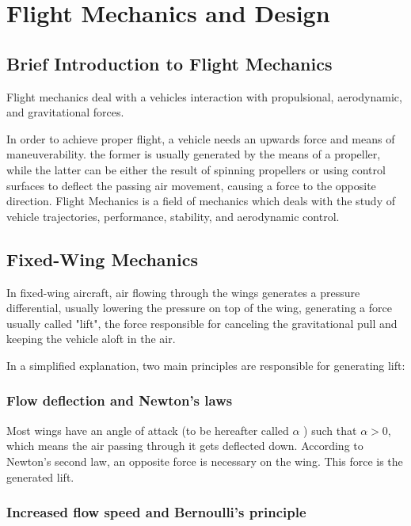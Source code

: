 
\chapter{Flight Mechanics and Design} \label{chap:FlightMechanics}

\section{Brief Introduction to Flight Mechanics}

Flight mechanics deal with a vehicles interaction with propulsional, aerodynamic, and gravitational forces.

In order to achieve proper flight, a vehicle needs an upwards force and means of maneuverability. the former is usually generated by the means of a propeller, while the latter can be either the result of spinning propellers or using control surfaces to deflect the passing air movement, causing a force to the opposite direction. 
%
Flight Mechanics is a field of mechanics which deals with the study of vehicle trajectories, performance, stability, and aerodynamic
control.


\section{Fixed-Wing Mechanics}

In fixed-wing aircraft, air flowing through the wings generates a pressure differential, usually lowering the pressure on top of the wing, generating a force usually called "lift", the force responsible for canceling the gravitational pull and keeping the vehicle aloft in the air.

In a simplified explanation, two main principles are responsible for generating lift:

\subsection{Flow deflection and Newton's laws}

Most wings have an angle of attack (to be hereafter called $\alpha$ ) such that $\alpha > 0$, which means the air passing through it gets deflected down. According to Newton's second law, an opposite force is necessary on the wing. This force is the generated lift.

\subsection{Increased flow speed and Bernoulli's principle}

